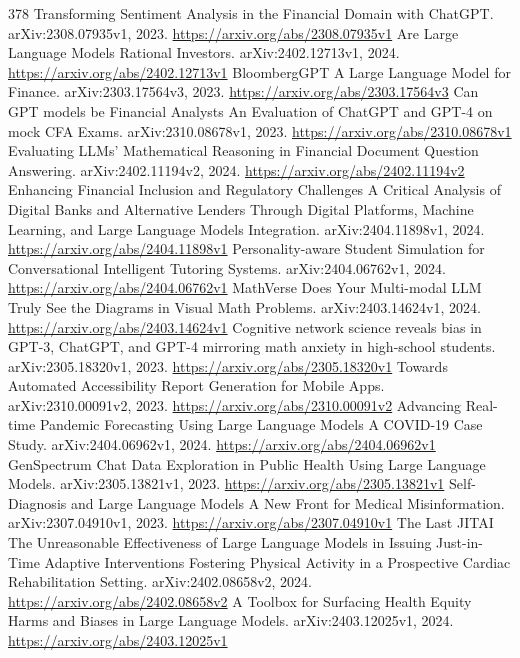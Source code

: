\documentclass[11pt]{article}
\begin{document}
\begin{thebibliography}{378}
 Transforming Sentiment Analysis in the Financial Domain with ChatGPT. arXiv:2308.07935v1, 2023. \url{https://arxiv.org/abs/2308.07935v1}
 Are Large Language Models Rational Investors. arXiv:2402.12713v1, 2024. \url{https://arxiv.org/abs/2402.12713v1}
 BloombergGPT A Large Language Model for Finance. arXiv:2303.17564v3, 2023. \url{https://arxiv.org/abs/2303.17564v3}
 Can GPT models be Financial Analysts An Evaluation of ChatGPT and GPT-4 on mock CFA Exams. arXiv:2310.08678v1, 2023. \url{https://arxiv.org/abs/2310.08678v1}
 Evaluating LLMs' Mathematical Reasoning in Financial Document Question Answering. arXiv:2402.11194v2, 2024. \url{https://arxiv.org/abs/2402.11194v2}
 Enhancing Financial Inclusion and Regulatory Challenges A Critical Analysis of Digital Banks and Alternative Lenders Through Digital Platforms, Machine Learning, and Large Language Models Integration. arXiv:2404.11898v1, 2024. \url{https://arxiv.org/abs/2404.11898v1}
 Personality-aware Student Simulation for Conversational Intelligent Tutoring Systems. arXiv:2404.06762v1, 2024. \url{https://arxiv.org/abs/2404.06762v1}
 MathVerse Does Your Multi-modal LLM Truly See the Diagrams in Visual Math Problems. arXiv:2403.14624v1, 2024. \url{https://arxiv.org/abs/2403.14624v1}
 Cognitive network science reveals bias in GPT-3, ChatGPT, and GPT-4 mirroring math anxiety in high-school students. arXiv:2305.18320v1, 2023. \url{https://arxiv.org/abs/2305.18320v1}
 Towards Automated Accessibility Report Generation for Mobile Apps. arXiv:2310.00091v2, 2023. \url{https://arxiv.org/abs/2310.00091v2}
 Advancing Real-time Pandemic Forecasting Using Large Language Models A COVID-19 Case Study. arXiv:2404.06962v1, 2024. \url{https://arxiv.org/abs/2404.06962v1}
 GenSpectrum Chat Data Exploration in Public Health Using Large Language Models. arXiv:2305.13821v1, 2023. \url{https://arxiv.org/abs/2305.13821v1}
 Self-Diagnosis and Large Language Models A New Front for Medical Misinformation. arXiv:2307.04910v1, 2023. \url{https://arxiv.org/abs/2307.04910v1}
 The Last JITAI The Unreasonable Effectiveness of Large Language Models in Issuing Just-in-Time Adaptive Interventions Fostering Physical Activity in a Prospective Cardiac Rehabilitation Setting. arXiv:2402.08658v2, 2024. \url{https://arxiv.org/abs/2402.08658v2}
 A Toolbox for Surfacing Health Equity Harms and Biases in Large Language Models. arXiv:2403.12025v1, 2024. \url{https://arxiv.org/abs/2403.12025v1}

\end{thebibliography}
\end{document}
